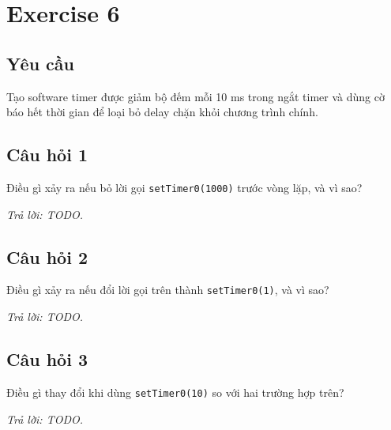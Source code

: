 \section{Exercise 6}

\subsection{Yêu cầu}
Tạo software timer được giảm bộ đếm mỗi 10 ms trong ngắt timer và dùng cờ báo
hết thời gian để loại bỏ delay chặn khỏi chương trình chính.

\subsection{Câu hỏi 1}
Điều gì xảy ra nếu bỏ lời gọi \texttt{setTimer0(1000)} trước vòng lặp, và vì sao?

\textit{Trả lời: TODO.}

\subsection{Câu hỏi 2}
Điều gì xảy ra nếu đổi lời gọi trên thành \texttt{setTimer0(1)}, và vì sao?

\textit{Trả lời: TODO.}

\subsection{Câu hỏi 3}
Điều gì thay đổi khi dùng \texttt{setTimer0(10)} so với hai trường hợp trên?

\textit{Trả lời: TODO.}
